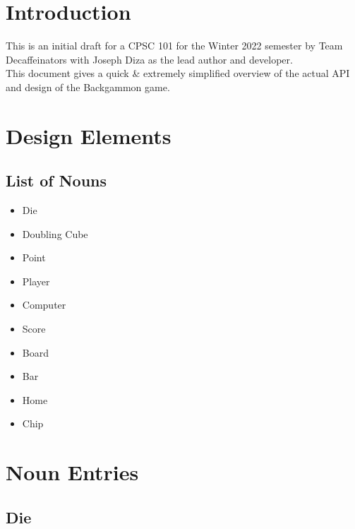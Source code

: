 \documentclass{report}
\begin{document}

\tableofcontents

\chapter{Introduction}

This is an initial draft for a CPSC 101 for the Winter 2022 semester by Team Decaffeinators
with Joseph Diza as the lead author and developer.  \\

\noindent
This document gives a quick \& extremely simplified overview
of the actual API and design of the Backgammon game.

\chapter{Design Elements}

\section{List of Nouns}

\begin{multicols}{2}
    \begin{itemize}
        \item Die
        \item Doubling Cube
        \item Point
        \item Player
        \item Computer
    \end{itemize}

    \begin{itemize}
        \item Score
        \item Board
        \item Bar
        \item Home
        \item Chip
    \end{itemize}
\end{multicols}

\chapter{Noun Entries}

\section{Die}
\end{document}
